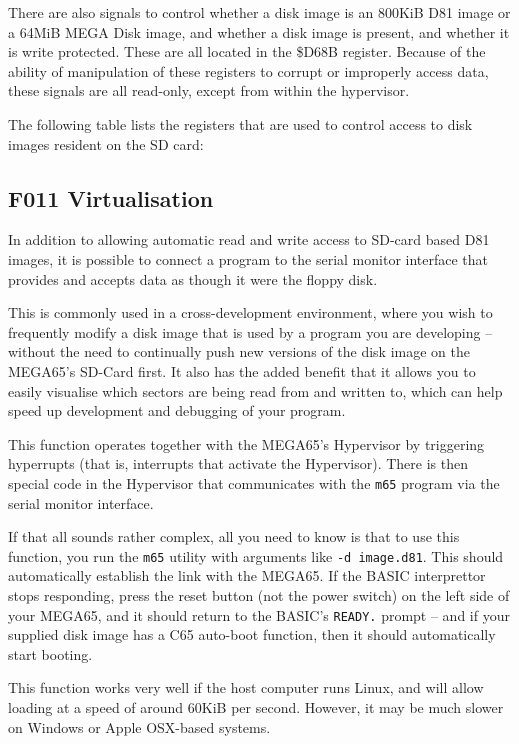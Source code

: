 There are also signals to control whether a disk image is an 800KiB
D81 image or a 64MiB MEGA Disk image, and whether a disk image is
present, and whether it is write protected. These are all located in
the \$D68B register. Because of the ability of manipulation of these
registers to corrupt or improperly access data, these signals are all
read-only, except from within the hypervisor.

The following table lists the registers that are used to control
access to disk images resident on the SD card:



\subsection{F011 Virtualisation}

In addition to allowing automatic read and write access to SD-card
based D81 images, it is possible to connect a program to the serial
monitor interface that provides and accepts data as though it were the
floppy disk.

This is commonly used in a cross-development
environment, where you wish to frequently modify a disk image that is
used by a program you are developing -- without the need to
continually push new versions of the disk image on the MEGA65's
SD-Card first. It also has the added benefit that it allows you to
easily visualise which sectors are being read from and written to,
which can help speed up development and debugging of your program.

This function operates together with the MEGA65's Hypervisor by
triggering hyperrupts (that is, interrupts that activate the
Hypervisor).  There is then special code in the Hypervisor that
communicates with the {\tt m65} program via the serial monitor
interface.

If that all sounds rather complex, all you need to know is that to use
this function, you run the {\tt m65} utility with arguments like
{\tt -d image.d81}.  This should automatically establish the link with
the MEGA65.  If the BASIC interprettor stops responding, press the
reset button (not the power switch) on the left side of your MEGA65,
and it should return to the BASIC's {\tt READY.} prompt -- and if your
supplied disk image has a C65 auto-boot function, then it should
automatically start booting.

This function works very well if the host computer runs Linux, and
will allow loading at a speed of around 60KiB per second.  However, it
may be much slower on Windows or Apple OSX-based systems.

